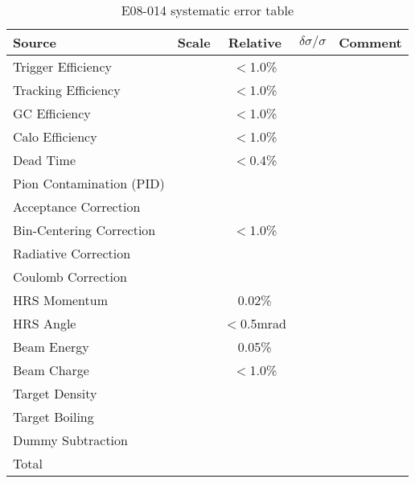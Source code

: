  \begin{table}[htbp]
 \centering
    \begin{tabular}{|l|c|c|c|c|}
    \hline
     Source               & Scale & Relative & $\delta\sigma/\sigma$& Comment   \\[6pt]
  \hline
    \hline
    Trigger Efficiency    &      &     $<$1.0\%  &                      &          \\[7pt] \hline
    Tracking Efficiency   &      &     $<$1.0\%  &                      &          \\[7pt] \hline
    GC Efficiency         &      &     $<$1.0\%  &                      &          \\[7pt] \hline
    Calo Efficiency       &      &     $<$1.0\%  &                      &          \\[7pt] \hline
     Dead Time             &      &     $<$0.4\%     &                      &      \\[7pt] \hline
    Pion Contamination (PID)    &      &          &                      &          \\[7pt] 
    \hline
    \hline
    Acceptance Correction       &      &          &                      &          \\[7pt] \hline
    Bin-Centering Correction    &      & $<$1.0\% &                      &          \\[7pt] \hline
    Radiative Correction        &      &          &                      &          \\[7pt] \hline
    Coulomb Correction          &      &          &                      &          \\[7pt]
    \hline
    \hline
    HRS Momentum         &      &   0.02\%      &                      &          \\[7pt] \hline
    HRS Angle            &      &   $<$0.5mrad  &                      &          \\[7pt] \hline
    Beam Energy          &      &   0.05\%      &                      &          \\[7pt] \hline
    Beam Charge          &      &   $<$1.0\%    &                      &          \\[7pt] 
   \hline
    \hline
    Target Density       &      &          &                      &          \\[7pt] \hline
    Target Boiling       &      &          &                      &          \\[7pt] \hline
    Dummy Subtraction    &      &          &                      &          \\[7pt] 
    \hline
    \hline
    Total               &       &          &                      &          \\[7pt]
    \hline
    \end{tabular}
      \caption{E08-014 systematic error table}
  \label{sys_table}
  \end{table}
  
